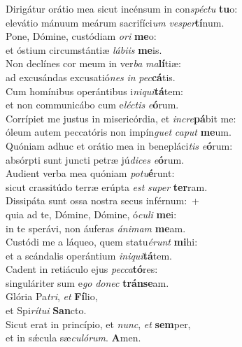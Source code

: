 \evenverse Dirigátur orátio mea sicut incénsum in con\textit{spé}\textit{ctu} \textbf{tu}o:~\*\\
\evenverse elevátio mánuum meárum sacrifíci\textit{um} \textit{ve}\textit{sper}\textbf{tí}num.\\
\oddverse Pone, Dómine, custódiam \textit{o}\textit{ri} \textbf{me}o:~\*\\
\oddverse et óstium circumstántiæ \textit{lá}\textit{bi}\textit{is} \textbf{me}is.\\
\evenverse Non declínes cor meum in ver\textit{ba} \textit{ma}\textbf{lí}tiæ:~\*\\
\evenverse ad excusándas excusatió\textit{nes} \textit{in} \textit{pec}\textbf{cá}tis.\\
\oddverse Cum homínibus operántibus i\textit{ni}\textit{qui}\textbf{tá}tem:~\*\\
\oddverse et non communicábo cum e\textit{lé}\textit{ctis} \textit{e}\textbf{ó}rum.\\
\evenverse Corrípiet me justus in misericórdia, et \textit{in}\textit{cre}\textbf{pá}bit me:~\*\\
\evenverse óleum autem peccatóris non impín\textit{guet} \textit{ca}\textit{put} \textbf{me}um.\\
\oddverse Quóniam adhuc et orátio mea in benepláci\textit{tis} \textit{e}\textbf{ó}rum:~\*\\
\oddverse absórpti sunt juncti petræ jú\textit{di}\textit{ces} \textit{e}\textbf{ó}rum.\\
\evenverse Audient verba mea quóniam \textit{po}\textit{tu}\textbf{é}runt:~\*\\
\evenverse sicut crassitúdo terræ erúpta \textit{est} \textit{su}\textit{per} \textbf{ter}ram.\\
\oddverse Dissipáta sunt ossa nostra secus inférnum:~+\\
\oddverse  quia ad te, Dómine, Dómine, ó\textit{cu}\textit{li} \textbf{me}i:~\*\\
\oddverse in te sperávi, non áuferas \textit{á}\textit{ni}\textit{mam} \textbf{me}am.\\
\evenverse Custódi me a láqueo, quem statu\textit{é}\textit{runt} \textbf{mi}hi:~\*\\
\evenverse et a scándalis operántium \textit{i}\textit{ni}\textit{qui}\textbf{tá}tem.\\
\oddverse Cadent in retiáculo ejus \textit{pec}\textit{ca}\textbf{tó}res:~\*\\
\oddverse singuláriter sum e\textit{go} \textit{do}\textit{nec} \textbf{trán}\textbf{se}am.\\
\evenverse Glória Pa\textit{tri}, \textit{et} \textbf{Fí}lio,~\*\\
\evenverse et Spi\textit{rí}\textit{tu}\textit{i} \textbf{San}cto.\\
\oddverse Sicut erat in princípio, et \textit{nunc}, \textit{et} \textbf{sem}per,~\*\\
\oddverse et in sǽcula sæ\textit{cu}\textit{ló}\textit{rum}. \textbf{A}men.\\
